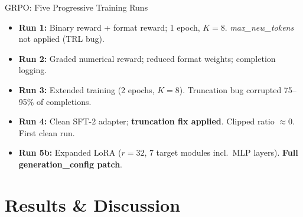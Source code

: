 \documentclass[10pt]{beamer}
\begin{document}
\begin{frame}{GRPO: Five Progressive Training Runs}
\large
\begin{itemize}
    \item \textbf{Run 1:} Binary reward + format reward; 1 epoch, $K=8$. \textit{max\_new\_tokens} not applied (TRL bug).
    \vspace{0.15cm}
    \item \textbf{Run 2:} Graded numerical reward; reduced format weights; completion logging.
    \vspace{0.15cm}
    \item \textbf{Run 3:} Extended training (2 epochs, $K=8$). Truncation bug corrupted 75--95\% of completions.
    \vspace{0.15cm}
    \item \textbf{Run 4:} Clean SFT-2 adapter; \textbf{truncation fix applied}. Clipped ratio $\approx 0$. First clean run.
    \vspace{0.15cm}
    \item \textbf{Run 5b:} Expanded LoRA ($r=32$, 7 target modules incl.\ MLP layers). \textbf{Full generation\_config patch}.
\end{itemize}
\end{frame}

\section{Results \& Discussion}
\end{document}
